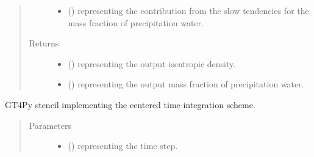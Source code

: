 \documentclass[letterpaper,10pt,english]{sphinxmanual}
\begin{document}
\begin{fulllineitems}
\begin{fulllineitems}
\begin{quote}
\begin{description}
\begin{itemize}
\item {} 
 () \textendash{}  representing the contribution from the slow tendencies for the mass fraction of
precipitation water.

\end{itemize}

\item[{Returns}] \leavevmode
\begin{itemize}
\item {} 
 () \textendash{}  representing the output isentropic density.

\item {} 
 () \textendash{}  representing the output mass fraction of precipitation water.

\end{itemize}


\end{description}\end{quote}

\end{fulllineitems}


\begin{fulllineitems}
\label{\detokenize{api:tasmania.dycore.prognostic_isentropic_centered.PrognosticIsentropicCentered._stencil_stepping_by_neglecting_vertical_advection_defs}}
GT4Py stencil implementing the centered time-integration scheme.
\begin{quote}\begin{description}
\item[{Parameters}] \leavevmode\begin{itemize}
\item {} 
 () \textendash{}  representing the time step.


\end{itemize}
\end{description}
\end{quote}
\end{fulllineitems}
\end{fulllineitems}
\end{document}

